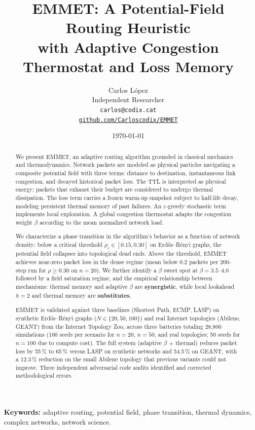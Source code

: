 \documentclass[11pt,a4paper]{article}
\title{EMMET: A Potential-Field Routing Heuristic\\
with Adaptive Congestion Thermostat and Loss Memory}
\author{Carlos L\'opez\\
\small Independent Researcher\\
\small \texttt{carlos@codix.cat}\\
\small \href{https://github.com/Carloscodix/EMMET}{\texttt{github.com/Carloscodix/EMMET}}}
\date{\today}
\begin{document}
\maketitle

\begin{abstract}
We present EMMET, an adaptive routing algorithm grounded in classical
mechanics and thermodynamics. Network packets are modeled as physical
particles navigating a composite potential field with three terms:
distance to destination, instantaneous link congestion, and decayed
historical packet loss. The TTL is interpreted as physical energy;
packets that exhaust their budget are considered to undergo thermal
dissipation. The loss term carries a frozen warm-up snapshot subject to
half-life decay, modeling persistent thermal memory of past failures.
An $\varepsilon$-greedy stochastic term implements local exploration. A
global congestion thermostat adapts the congestion weight $\beta$
according to the mean normalized network load.

We characterize a phase transition in the algorithm's behavior as a
function of network density: below a critical threshold
$\rho_c \in [0.15, 0.30]$ on Erd\H{o}s--R\'enyi graphs, the potential
field collapses into topological dead ends. Above the threshold, EMMET
achieves near-zero packet loss in the dense regime (mean below 0.2
packets per 200-step run for $\rho \geq 0.30$ on $n=20$). We further
identify a $\beta$ sweet spot at $\beta = 3.5$--$4.0$ followed by a
field saturation regime, and the empirical relationship between mechanisms:
thermal memory and adaptive $\beta$ are \textbf{synergistic}, while
local lookahead $h{=}2$ and thermal memory are \textbf{substitutes}.

EMMET is validated against three baselines (Shortest Path, ECMP, LASP)
on synthetic Erd\H{o}s--R\'enyi graphs ($N \in \{20, 50, 100\}$) and
real Internet topologies (Abilene, GEANT) from the Internet Topology
Zoo, across three batteries totaling 28{,}800 simulations
(100 seeds per scenario for $n=20$, $n=50$, and real topologies; 50
seeds for $n=100$ due to compute cost). The full system (adaptive
$\beta$ + thermal) reduces packet loss by 55\,\% to 65\,\% versus LASP
on synthetic networks and 54.5\,\% on GEANT, with a 12.3\,\%
reduction on the small Abilene topology that previous variants could
not improve. Three independent adversarial code audits identified and
corrected methodological errors.
\end{abstract}

\textbf{Keywords:} adaptive routing, potential field, phase transition,
thermal dynamics, complex networks, network science.
\end{document}
